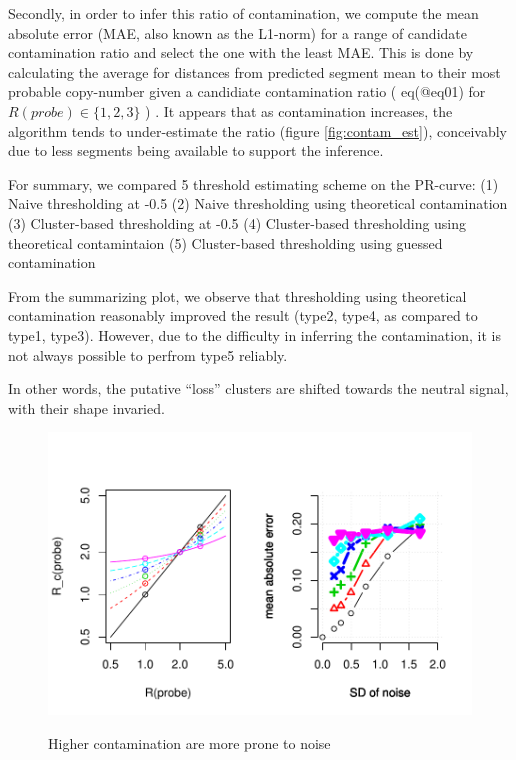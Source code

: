 \documentclass[]{article}
\begin{document}
Secondly, in order to infer this ratio of contamination, we compute the
mean absolute error (MAE, also known as the L1-norm) for a range of
candidate contamination ratio and select the one with the least MAE.
This is done by calculating the average for distances from predicted
segment mean to their most probable copy-number given a candidiate
contamination ratio ( eq(@eq01) for \(R(probe) \in \{1,2,3\}\) ) . It
appears that as contamination increases, the algorithm tends to
under-estimate the ratio (figure \ref{fig:contam_est}), conceivably due
to less segments being available to support the inference.

For summary, we compared 5 threshold estimating scheme on the PR-curve:
(1) Naive thresholding at -0.5 (2) Naive thresholding using theoretical
contamination (3) Cluster-based thresholding at -0.5 (4) Cluster-based
thresholding using theoretical contamintaion (5) Cluster-based
thresholding using guessed contamination

From the summarizing plot, we observe that thresholding using
theoretical contamination reasonably improved the result (type2, type4,
as compared to type1, type3). However, due to the difficulty in
inferring the contamination, it is not always possible to perfrom type5
reliably.

In other words, the putative ``loss'' clusters are shifted towards the
neutral signal, with their shape invaried.

\begin{figure}
\includegraphics[width=6in]{contam.pdf}
\label{fig:contam_stat}
\caption{Higher contamination are more prone to noise}
\end{figure}
\end{document}
